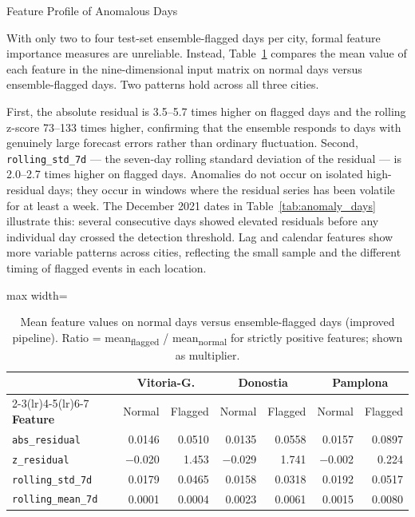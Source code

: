 ﻿\documentclass[12pt,reqno, twoside]{amsbook}
\makeatletter
\numberwithin{figure}{chapter}
\numberwithin{table}{chapter}
\numberwithin{equation}{chapter}
\def\subsection{\@startsection{subsection}{2}%
      \z@{.5\linespacing\@plus.7\linespacing}{.25\linespacing}%
      {\normalfont\bfseries\flushleft}}
\theoremstyle{plain}
\numberwithin{equation}{chapter}
\numberwithin{section}{chapter}
\makeatother
\begin{document}
\FloatBarrier

\subsection{Feature Profile of Anomalous Days}
\label{subsec:anomaly_features}

With only two to four test-set ensemble-flagged days per city, formal feature importance measures are unreliable. Instead, Table~\ref{tab:anomaly_feature_profile} compares the mean value of each feature in the nine-dimensional input matrix on normal days versus ensemble-flagged days. Two patterns hold across all three cities.

First, the absolute residual is 3.5--5.7 times higher on flagged days and the rolling z-score 73--133 times higher, confirming that the ensemble responds to days with genuinely large forecast errors rather than ordinary fluctuation. Second, \texttt{rolling\_std\_7d} --- the seven-day rolling standard deviation of the residual --- is 2.0--2.7 times higher on flagged days. Anomalies do not occur on isolated high-residual days; they occur in windows where the residual series has been volatile for at least a week. The December 2021 dates in Table~\ref{tab:anomaly_days} illustrate this: several consecutive days showed elevated residuals before any individual day crossed the detection threshold. Lag and calendar features show more variable patterns across cities, reflecting the small sample and the different timing of flagged events in each location.

\begin{table}[htbp]
\centering
\caption{Mean feature values on normal days versus ensemble-flagged days (improved pipeline). Ratio = mean\textsubscript{flagged} / mean\textsubscript{normal} for strictly positive features; shown as multiplier.}
\label{tab:anomaly_feature_profile}
\begin{adjustbox}{max width=\textwidth}
\begin{tabular}{lrrrrrr}
\toprule
& \multicolumn{2}{c}{\textbf{Vitoria-G.}} & \multicolumn{2}{c}{\textbf{Donostia}} & \multicolumn{2}{c}{\textbf{Pamplona}} \\
\cmidrule(lr){2-3}\cmidrule(lr){4-5}\cmidrule(lr){6-7}
\textbf{Feature} & Normal & Flagged & Normal & Flagged & Normal & Flagged \\
\midrule
\texttt{abs\_residual}   & 0.0146 & 0.0510 & 0.0135 & 0.0558 & 0.0157 & 0.0897 \\
\texttt{z\_residual}     & $-$0.020 & 1.453 & $-$0.029 & 1.741 & $-$0.002 & 0.224 \\
\texttt{rolling\_std\_7d}& 0.0179 & 0.0465 & 0.0158 & 0.0318 & 0.0192 & 0.0517 \\
\texttt{rolling\_mean\_7d}&0.0001 & 0.0004 & 0.0023 & 0.0061 & 0.0015 & 0.0080 \\
\bottomrule
\end{tabular}
\end{adjustbox}
\end{table}
\end{document}

